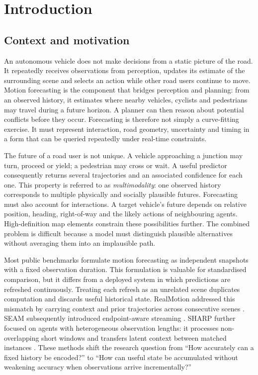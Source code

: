\chapter{Introduction}
\label{chap:introduction}

\section{Context and motivation}

An autonomous vehicle does not make decisions from a static picture of the road. It repeatedly receives observations from perception, updates its estimate of the surrounding scene and selects an action while other road users continue to move. Motion forecasting is the component that bridges perception and planning: from an observed history, it estimates where nearby vehicles, cyclists and pedestrians may travel during a future horizon. A planner can then reason about potential conflicts before they occur. Forecasting is therefore not simply a curve-fitting exercise. It must represent interaction, road geometry, uncertainty and timing in a form that can be queried repeatedly under real-time constraints.

The future of a road user is not unique. A vehicle approaching a junction may turn, proceed or yield; a pedestrian may cross or wait. A useful predictor consequently returns several trajectories and an associated confidence for each one. This property is referred to as \emph{multimodality}: one observed history corresponds to multiple physically and socially plausible futures. Forecasting must also account for interactions. A target vehicle's future depends on relative position, heading, right-of-way and the likely actions of neighbouring agents. High-definition map elements constrain these possibilities further. The combined problem is difficult because a model must distinguish plausible alternatives without averaging them into an implausible path.

Most public benchmarks formulate motion forecasting as independent snapshots with a fixed observation duration. This formulation is valuable for standardised comparison, but it differs from a deployed system in which predictions are refreshed continuously. Treating each refresh as an unrelated scene duplicates computation and discards useful historical state. RealMotion addressed this mismatch by carrying context and prior trajectories across consecutive scenes \cite{song2024realmotion}. SEAM subsequently introduced endpoint-aware streaming \cite{prutsch2026seam}. SHARP further focused on agents with heterogeneous observation lengths: it processes non-overlapping short windows and transfers latent context between matched instances \cite{prutsch2026sharp}. These methods shift the research question from ``How accurately can a fixed history be encoded?'' to ``How can useful state be accumulated without weakening accuracy when observations arrive incrementally?''

